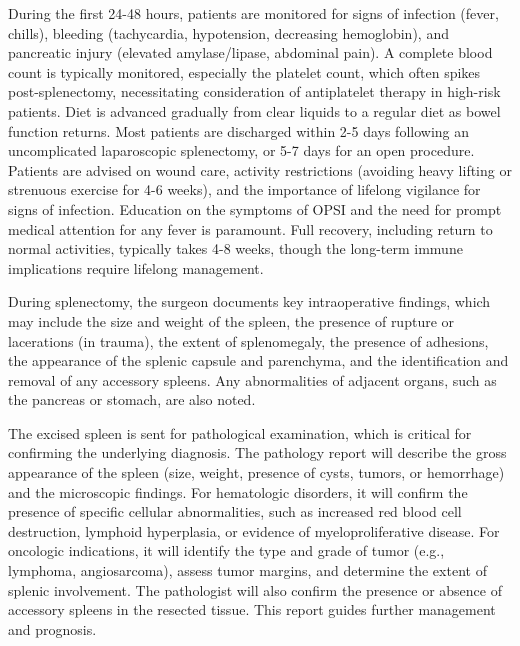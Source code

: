 During the first 24-48 hours, patients are monitored for signs of infection (fever, chills), bleeding (tachycardia, hypotension, decreasing hemoglobin), and pancreatic injury (elevated amylase/lipase, abdominal pain). A complete blood count is typically monitored, especially the platelet count, which often spikes post-splenectomy, necessitating consideration of antiplatelet therapy in high-risk patients. Diet is advanced gradually from clear liquids to a regular diet as bowel function returns. Most patients are discharged within 2-5 days following an uncomplicated laparoscopic splenectomy, or 5-7 days for an open procedure. Patients are advised on wound care, activity restrictions (avoiding heavy lifting or strenuous exercise for 4-6 weeks), and the importance of lifelong vigilance for signs of infection. Education on the symptoms of OPSI and the need for prompt medical attention for any fever is paramount. Full recovery, including return to normal activities, typically takes 4-8 weeks, though the long-term immune implications require lifelong management.

During splenectomy, the surgeon documents key intraoperative findings, which may include the size and weight of the spleen, the presence of rupture or lacerations (in trauma), the extent of splenomegaly, the presence of adhesions, the appearance of the splenic capsule and parenchyma, and the identification and removal of any accessory spleens. Any abnormalities of adjacent organs, such as the pancreas or stomach, are also noted.

The excised spleen is sent for pathological examination, which is critical for confirming the underlying diagnosis. The pathology report will describe the gross appearance of the spleen (size, weight, presence of cysts, tumors, or hemorrhage) and the microscopic findings. For hematologic disorders, it will confirm the presence of specific cellular abnormalities, such as increased red blood cell destruction, lymphoid hyperplasia, or evidence of myeloproliferative disease. For oncologic indications, it will identify the type and grade of tumor (e.g., lymphoma, angiosarcoma), assess tumor margins, and determine the extent of splenic involvement. The pathologist will also confirm the presence or absence of accessory spleens in the resected tissue. This report guides further management and prognosis.

